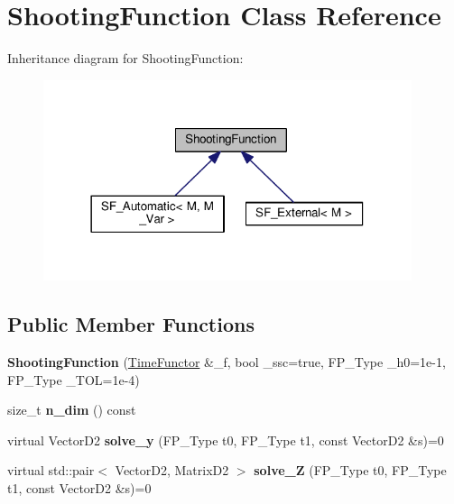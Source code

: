 \hypertarget{classShootingFunction}{}\section{Shooting\+Function Class Reference}
\label{classShootingFunction}


Inheritance diagram for Shooting\+Function\+:\nopagebreak
\begin{figure}[H]
\begin{center}
\leavevmode
\includegraphics[width=306pt]{classShootingFunction__inherit__graph}
\end{center}
\end{figure}
\subsection*{Public Member Functions}
\begin{DoxyCompactItemize}
\item 
\mbox{\label{classShootingFunction_a84f50a64e417a35a9a9c3dc561fbb9a9}} 
{\bfseries Shooting\+Function} (\hyperlink{classTimeFunctor}{Time\+Functor} \&\+\_\+f, bool \+\_\+ssc=true, F\+P\+\_\+\+Type \+\_\+h0=1e-\/1, F\+P\+\_\+\+Type \+\_\+\+T\+O\+L=1e-\/4)
\item 
\mbox{\label{classShootingFunction_a39e6d5052e9d73ca3f5d4986752525aa}} 
size\+\_\+t {\bfseries n\+\_\+dim} () const
\item 
\mbox{\label{classShootingFunction_acb29074b32316fdd368d71a775983f81}} 
virtual Vector\+D2 {\bfseries solve\+\_\+y} (F\+P\+\_\+\+Type t0, F\+P\+\_\+\+Type t1, const Vector\+D2 \&s)=0
\item 
\mbox{\label{classShootingFunction_a41360056996ee70c43c4538acd6e28d8}} 
virtual std\+::pair$<$ Vector\+D2, Matrix\+D2 $>$ {\bfseries solve\+\_\+Z} (F\+P\+\_\+\+Type t0, F\+P\+\_\+\+Type t1, const Vector\+D2 \&s)=0
\end{DoxyCompactItemize}
